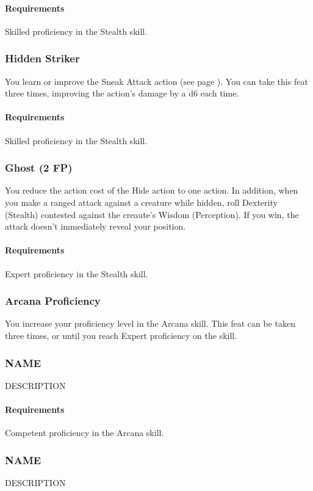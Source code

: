     \paragraph{Requirements} Skilled proficiency in the Stealth skill.
\subsubsection{Hidden Striker} \label{feat::hiddenstriker}
    You learn or improve the Sneak Attack action (see page \pageref{act:sneakattack}).
    You can take this feat three times, improving the action's damage by a d6 each time.
    \paragraph{Requirements} Skilled proficiency in the Stealth skill.
\subsubsection{Ghost (2 FP)} \label{feat::ghost}
    You reduce the action cost of the Hide action to one action.
    In addition, when you make a ranged attack against a creature while hidden, roll Dexterity (Stealth) contested against the creaute's Wisdom (Perception).
    If you win, the attack doesn't immediately reveal your position.
    \paragraph{Requirements} Expert proficiency in the Stealth skill.
\subsubsection{Arcana Proficiency} \label{feat::arcanaprof}
    You increase your proficiency level in the Arcana skill.
    This feat can be taken three times, or until you reach Expert proficiency on the skill.
\subsubsection{NAME} \label{feat::name}
    DESCRIPTION
    \paragraph{Requirements} Competent proficiency in the Arcana skill.
\subsubsection{NAME} \label{feat::name}
    DESCRIPTION

